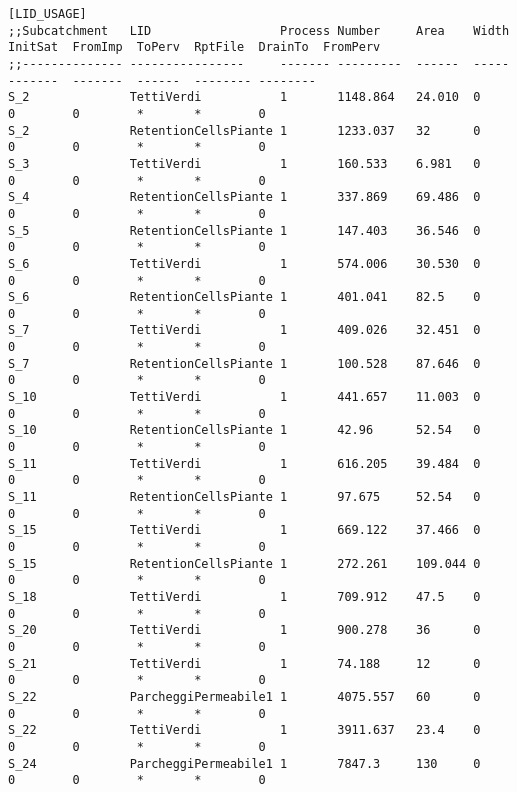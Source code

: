 \begin{landscape}
\begin{lstlisting}[basicstyle=\footnotesize\ttfamily]
[LID_USAGE]
;;Subcatchment   LID                  Process Number     Area    Width  InitSat  FromImp  ToPerv  RptFile  DrainTo  FromPerv
;;-------------- ----------------     ------- ---------  ------  -----  -------  -------  ------  -------- --------
S_2              TettiVerdi           1       1148.864   24.010  0      0        0        *       *        0
S_2              RetentionCellsPiante 1       1233.037   32      0      0        0        *       *        0
S_3              TettiVerdi           1       160.533    6.981   0      0        0        *       *        0
S_4              RetentionCellsPiante 1       337.869    69.486  0      0        0        *       *        0
S_5              RetentionCellsPiante 1       147.403    36.546  0      0        0        *       *        0
S_6              TettiVerdi           1       574.006    30.530  0      0        0        *       *        0
S_6              RetentionCellsPiante 1       401.041    82.5    0      0        0        *       *        0
S_7              TettiVerdi           1       409.026    32.451  0      0        0        *       *        0
S_7              RetentionCellsPiante 1       100.528    87.646  0      0        0        *       *        0
S_10             TettiVerdi           1       441.657    11.003  0      0        0        *       *        0
S_10             RetentionCellsPiante 1       42.96      52.54   0      0        0        *       *        0
S_11             TettiVerdi           1       616.205    39.484  0      0        0        *       *        0
S_11             RetentionCellsPiante 1       97.675     52.54   0      0        0        *       *        0
S_15             TettiVerdi           1       669.122    37.466  0      0        0        *       *        0
S_15             RetentionCellsPiante 1       272.261    109.044 0      0        0        *       *        0
S_18             TettiVerdi           1       709.912    47.5    0      0        0        *       *        0
S_20             TettiVerdi           1       900.278    36      0      0        0        *       *        0
S_21             TettiVerdi           1       74.188     12      0      0        0        *       *        0
S_22             ParcheggiPermeabile1 1       4075.557   60      0      0        0        *       *        0
S_22             TettiVerdi           1       3911.637   23.4    0      0        0        *       *        0
S_24             ParcheggiPermeabile1 1       7847.3     130     0      0        0        *       *        0
\end{lstlisting}
\end{landscape}

